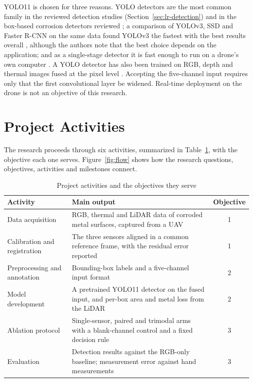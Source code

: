 YOLO11 is chosen for three reasons. YOLO detectors are the most common family in
the reviewed detection studies (Section~\ref{sec:lr-detection}) and in the
box-based corrosion detectors reviewed \citep{Mao2026,Fu2024,Bui2026,Li2024b,Yu2023};
a comparison of YOLOv3, SSD and Faster R-CNN on the same data found YOLOv3 the
fastest with the best results overall \citep{Srivastava2021}, although the
authors note that the best choice depends on the application; and as a
single-stage detector it is fast enough to run on a drone's own computer
\citep{Yu2023}. A YOLO detector has also been trained on RGB, depth and thermal images
fused at the pixel level \citep{Cao2026}. Accepting the five-channel input
requires only that the first convolutional layer be widened. Real-time
deployment on the drone is not an objective of this research.

\section{Project Activities}
\label{sec:project-activities}

The research proceeds through six activities, summarized in
Table~\ref{tab:activities}, with the objective each one serves.
Figure~\ref{fig:flow} shows how the research questions, objectives, activities
and milestones connect.

\begin{table}[htbp]
\centering
\caption{Project activities and the objectives they serve}
\label{tab:activities}
\small
\renewcommand{\arraystretch}{1.2}
\begin{tabularx}{\textwidth}{@{}>{\RaggedRight\arraybackslash}p{3.6cm}>{\RaggedRight\arraybackslash}Xc@{}}
\toprule
\textbf{Activity} & \textbf{Main output} & \textbf{Objective} \\
\midrule
Data acquisition & RGB, thermal and LiDAR data of corroded metal surfaces, captured from a UAV & 1 \\
Calibration and registration & The three sensors aligned in a common reference frame, with the residual error reported & 1 \\
Preprocessing and annotation & Bounding-box labels and a five-channel input format & 2 \\
Model development & A pretrained YOLO11 detector on the fused input, and per-box area and metal loss from the LiDAR & 2 \\
Ablation protocol & Single-sensor, paired and trimodal arms with a blank-channel control and a fixed decision rule & 3 \\
Evaluation & Detection results against the RGB-only baseline; measurement error against hand measurements & 3 \\
\bottomrule
\end{tabularx}
\end{table}

